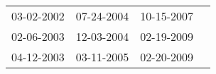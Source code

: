 \begin{supertabular}{llll}
 03-02-2002 &  07-24-2004 &  10-15-2007 \\
 02-06-2003 &  12-03-2004 &  02-19-2009 \\
 04-12-2003 &  03-11-2005 &  02-20-2009 \\
\end{supertabular}
